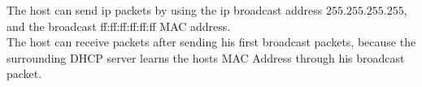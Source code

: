 The host can send ip packets by using the ip broadcast address $255.255.255.255$, and the broadcast ff:ff:ff:ff:ff:ff MAC address. \\
The host can receive packets after sending his first broadcast packets, because the surrounding DHCP server learns the hosts MAC Address through his broadcast packet.
